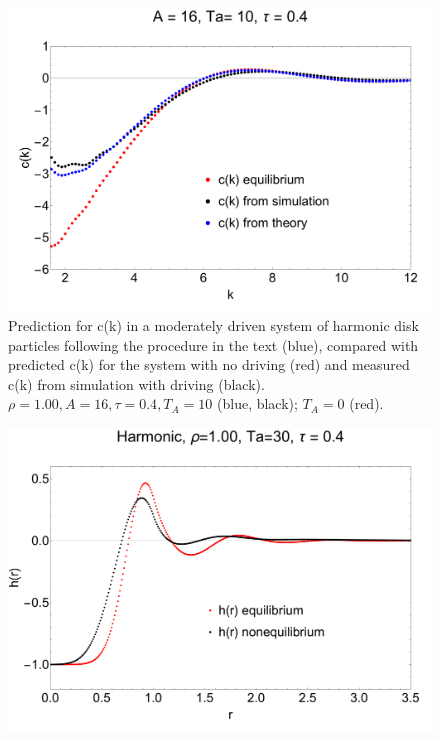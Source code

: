 \documentclass[amsmath,preprintnumbers,10pt,nofootinbib,prl,twocolumn]{revtex4-1}
\begin{document}
\begin{figure}
    \centering
    \includegraphics[scale=0.25, clip=True]{Ck_A16_T10_U0.4.pdf}
    \caption{Prediction for c(k) in a moderately driven system of harmonic disk particles following the procedure in the text (blue), compared with predicted c(k) for the system with no driving (red) and measured c(k) from simulation with driving (black). $\rho = 1.00, A = 16, \tau = 0.4, T_A = 10$ (blue, black); $T_A = 0$ (red).}
    \label{Fig:n}
\end{figure}

\begin{figure}
    \centering
    \includegraphics[scale=0.25, clip=True]{HarmonicA16_p1.0_Ta30_U0.40.pdf}
    \caption{}
    \label{Fig:n}
\end{figure}
\end{document}
